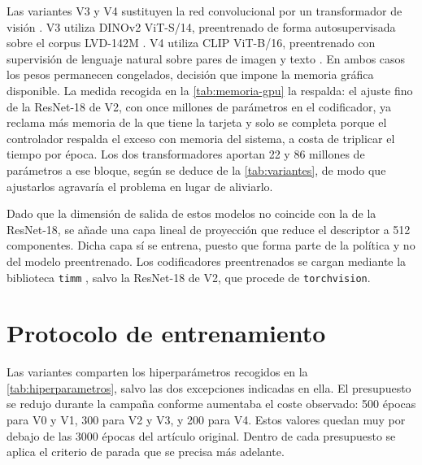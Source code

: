 Las variantes V3 y V4 sustituyen la red convolucional por un transformador de visi\'on
\cite{dosovitskiy2021vit}. V3 utiliza DINOv2 ViT-S/14, preentrenado de forma
autosupervisada sobre el corpus LVD-142M \cite{oquab2024dinov2}. V4 utiliza CLIP ViT-B/16,
preentrenado con supervisi\'on de lenguaje natural sobre pares de imagen y texto
\cite{radford2021clip}. En ambos casos los pesos permanecen congelados, decisi\'on que
impone la memoria gr\'afica disponible. La medida recogida en la \cref{tab:memoria-gpu} la
respalda: el ajuste fino de la ResNet-18 de V2, con once millones de par\'ametros en el
codificador, ya reclama m\'as memoria de la que tiene la tarjeta y solo se completa porque
el controlador respalda el exceso con memoria del sistema, a costa de triplicar el tiempo
por \'epoca. Los dos transformadores aportan \num{22} y \num{86} millones de par\'ametros a
ese bloque, seg\'un se deduce de la \cref{tab:variantes}, de modo que ajustarlos agravar\'ia
el problema en lugar de aliviarlo.

Dado que la dimensi\'on de salida de estos modelos no coincide con la de la ResNet-18, se
a\~nade una capa lineal de proyecci\'on que reduce el descriptor a \num{512} componentes.
Dicha capa s\'i se entrena, puesto que forma parte de la pol\'itica y no del modelo
preentrenado. Los codificadores preentrenados se cargan mediante la biblioteca
\texttt{timm} \cite{wightman2019timm}, salvo la ResNet-18 de V2, que procede de
\texttt{torchvision}.

\section{Protocolo de entrenamiento}
\label{sec:protocolo}

Las variantes comparten los hiperpar\'ametros recogidos en la
\cref{tab:hiperparametros}, salvo las dos excepciones indicadas en ella. El presupuesto se
redujo durante la campa\~na conforme aumentaba el coste observado: \num{500} \'epocas para
V0 y V1, \num{300} para V2 y V3, y \num{200} para V4. Estos valores quedan muy por debajo
de las \num{3000} \'epocas del art\'iculo original. Dentro de cada presupuesto se aplica el
criterio de parada que se precisa m\'as adelante.


